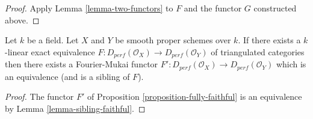 \begin{proof}
Apply Lemma \ref{lemma-two-functors} to $F$ and the functor
$G$ constructed above.
\end{proof}

\begin{proposition}
\label{proposition-equivalence}
Let $k$ be a field. Let $X$ and $Y$ be smooth proper schemes over $k$.
If there exists a $k$-linear exact equivalence
$F : D_{perf}(\mathcal{O}_X) \to D_{perf}(\mathcal{O}_Y)$
of triangulated categories then there exists a Fourier-Mukai functor
$F' : D_{perf}(\mathcal{O}_X) \to D_{perf}(\mathcal{O}_Y)$
which is an equivalence (and is a sibling of $F$).
\end{proposition}

\begin{proof}
The functor $F'$ of Proposition \ref{proposition-fully-faithful}
is an equivalence by Lemma \ref{lemma-sibling-faithful}.
\end{proof}











